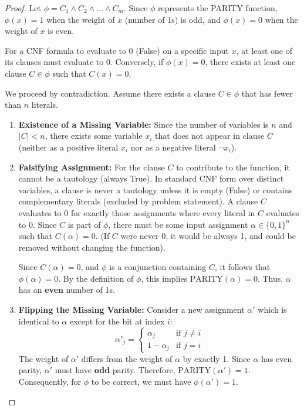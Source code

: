\documentclass[12pt,a4paper]{article}
\theoremstyle{definition}
\begin{document}
\begin{proof}
Let $\phi = C_1 \land C_2 \land \dots \land C_m$. Since $\phi$ represents the PARITY function, $\phi(x) = 1$ when the weight of $x$ (number of 1s) is odd, and $\phi(x) = 0$ when the weight of $x$ is even.

For a CNF formula to evaluate to 0 (False) on a specific input $x$, at least one of its clauses must evaluate to 0. Conversely, if $\phi(x) = 0$, there exists at least one clause $C \in \phi$ such that $C(x) = 0$.

We proceed by contradiction. Assume there exists a clause $C \in \phi$ that has fewer than $n$ literals.

\begin{enumerate}
    \item \textbf{Existence of a Missing Variable:}
    Since the number of variables is $n$ and $|C| < n$, there exists some variable $x_i$ that does not appear in clause $C$ (neither as a positive literal $x_i$ nor as a negative literal $\neg x_i$).

    \item \textbf{Falsifying Assignment:}
    For the clause $C$ to contribute to the function, it cannot be a tautology (always True). In standard CNF form over distinct variables, a clause is never a tautology unless it is empty (False) or contains complementary literals (excluded by problem statement).
    A clause $C$ evaluates to 0 for exactly those assignments where every literal in $C$ evaluates to 0.
    Since $C$ is part of $\phi$, there must be some input assignment $\alpha \in \{0,1\}^n$ such that $C(\alpha) = 0$. (If $C$ were never 0, it would be always 1, and could be removed without changing the function).
    
    Since $C(\alpha) = 0$, and $\phi$ is a conjunction containing $C$, it follows that $\phi(\alpha) = 0$.
    By the definition of $\phi$, this implies $\text{PARITY}(\alpha) = 0$. Thus, $\alpha$ has an \textbf{even} number of 1s.

    \item \textbf{Flipping the Missing Variable:}
    Consider a new assignment $\alpha'$ which is identical to $\alpha$ except for the bit at index $i$:
    \[
    \alpha'_j = \begin{cases} 
    \alpha_j & \text{if } j \neq i \\
    1 - \alpha_j & \text{if } j = i 
    \end{cases}
    \]
    The weight of $\alpha'$ differs from the weight of $\alpha$ by exactly 1.
    Since $\alpha$ has even parity, $\alpha'$ must have \textbf{odd} parity.
    Therefore, $\text{PARITY}(\alpha') = 1$.
    Consequently, for $\phi$ to be correct, we must have $\phi(\alpha') = 1$.


\end{enumerate}
\end{proof}
\end{document}
